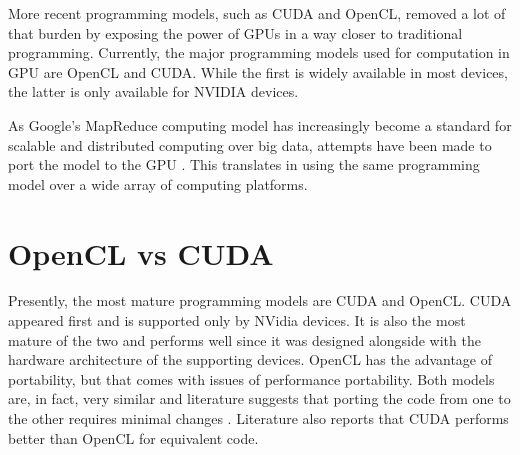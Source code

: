More recent programming models, such as CUDA and OpenCL, removed a lot of that burden by exposing the power of GPUs in a way closer to traditional programming.
Currently, the major programming models used for computation in GPU are OpenCL and CUDA.
While the first is widely available in most devices, the latter is only available for NVIDIA devices.

As Google's MapReduce computing model has increasingly become a standard for scalable and distributed computing over big data, attempts have been made to port the model to the GPU \cite{Ji2011,Xin2012,He2008}.
This translates in using the same programming model over a wide array of computing platforms.


\section{OpenCL vs CUDA}

Presently, the most mature programming models are CUDA and OpenCL.
CUDA appeared first and is supported only by NVidia devices.
It is also the most mature of the two and performs well since it was designed alongside with the hardware architecture of the supporting devices.
OpenCL has the advantage of portability, but that comes with issues of performance portability.
Both models are, in fact, very similar and literature suggests that porting the code from one to the other requires minimal changes \cite{Karimi2010,Su2012}.
Literature also reports that CUDA performs better than OpenCL \cite{Su2012} for equivalent code.







